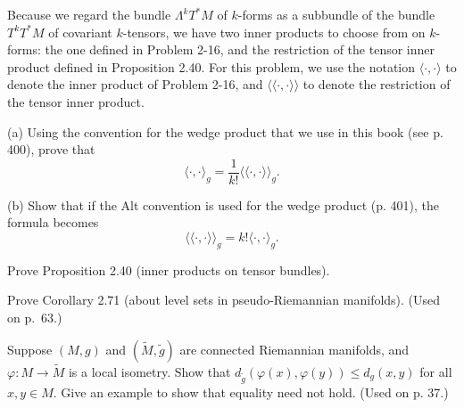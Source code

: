 \begin{exercise}
\label{prob:inner-products-k-forms}
Because we regard the bundle $\Lambda^k T^* M$ of $k$-forms as a subbundle of the bundle $T^k T^* M$ of covariant $k$-tensors, we have two inner products to choose from on $k$-forms: the one defined in Problem 2-16, and the restriction of the tensor inner product defined in Proposition 2.40. For this problem, we use the notation $\langle \cdot, \cdot \rangle$ to denote the inner product of Problem 2-16, and $\langle\langle \cdot, \cdot \rangle\rangle$ to denote the restriction of the tensor inner product.

(a) Using the convention for the wedge product that we use in this book (see p. 400), prove that
\[
\langle \cdot, \cdot \rangle_g = \frac{1}{k!} \langle\langle \cdot, \cdot \rangle\rangle_g.
\]

(b) Show that if the Alt convention is used for the wedge product (p. 401), the formula becomes
\[
\langle\langle \cdot, \cdot \rangle\rangle_g = k! \langle \cdot, \cdot \rangle_g.
\]
\end{exercise}

\begin{exercise}\label{prob:inner-products-tensor-bundles}
Prove Proposition 2.40 (inner products on tensor bundles).
\end{exercise}

\begin{exercise}\label{prob:level-sets-pseudo-riemannian}


Prove Corollary 2.71 (about level sets in pseudo-Riemannian manifolds). (Used on p.\ 63.)
\end{exercise}

\begin{exercise}\label{prob:local-isometry-distance}


Suppose $(M,g)$ and $(\tilde{M}, \tilde{g})$ are connected Riemannian manifolds, and $\varphi: M \to \tilde{M}$ is a local isometry. Show that $d_{\tilde{g}}(\varphi(x), \varphi(y)) \leq d_g(x,y)$ for all $x, y \in M$. Give an example to show that equality need not hold. (Used on p. 37.)
\end{exercise}

